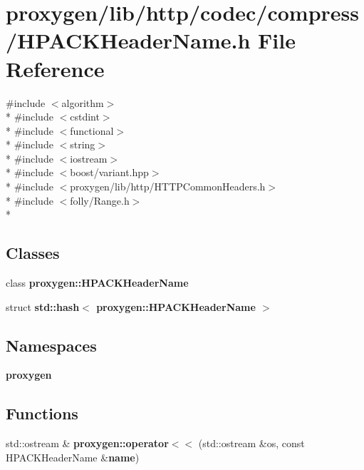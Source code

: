 \section{proxygen/lib/http/codec/compress/\+H\+P\+A\+C\+K\+Header\+Name.h File Reference}
\label{HPACKHeaderName_8h}
{\ttfamily \#include $<$algorithm$>$}\\*
{\ttfamily \#include $<$cstdint$>$}\\*
{\ttfamily \#include $<$functional$>$}\\*
{\ttfamily \#include $<$string$>$}\\*
{\ttfamily \#include $<$iostream$>$}\\*
{\ttfamily \#include $<$boost/variant.\+hpp$>$}\\*
{\ttfamily \#include $<$proxygen/lib/http/\+H\+T\+T\+P\+Common\+Headers.\+h$>$}\\*
{\ttfamily \#include $<$folly/\+Range.\+h$>$}\\*
\subsection*{Classes}
\begin{DoxyCompactItemize}
\item 
class {\bf proxygen\+::\+H\+P\+A\+C\+K\+Header\+Name}
\item 
struct {\bf std\+::hash$<$ proxygen\+::\+H\+P\+A\+C\+K\+Header\+Name $>$}
\end{DoxyCompactItemize}
\subsection*{Namespaces}
\begin{DoxyCompactItemize}
\item 
 {\bf proxygen}
\end{DoxyCompactItemize}
\subsection*{Functions}
\begin{DoxyCompactItemize}
\item 
std\+::ostream \& {\bf proxygen\+::operator$<$$<$} (std\+::ostream \&os, const H\+P\+A\+C\+K\+Header\+Name \&{\bf name})
\end{DoxyCompactItemize}
